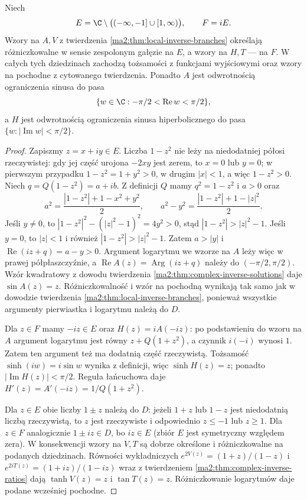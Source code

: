 \begin{twierdzenie}
\label{ma2:thm:standard-inverse-branches}
Niech
\[
 E=\C\setminus\big((-\infty,-1]\cup[1,\infty)\big),
 \qquad F=iE.
\]
Wzory na $A,V$ z twierdzenia \ref{ma2:thm:local-inverse-branches}
określają różniczkowalne w sensie zespolonym gałęzie
na $E$, a wzory na $H,T$ --- na $F$. W całych tych
dziedzinach zachodzą tożsamości z funkcjami wyjściowymi
oraz wzory na pochodne z cytowanego twierdzenia.
Ponadto $A$ jest odwrotnością ograniczenia sinusa do pasa
\[
 \{w\in\C:-\pi/2<\operatorname{Re}w<\pi/2\},
\]
a $H$ jest odwrotnością ograniczenia sinusa hiperbolicznego
do pasa $\{w:|\operatorname{Im}w|<\pi/2\}$.
\end{twierdzenie}
\begin{proof}
Zapiszmy $z=x+iy\in E$. Liczba $1-z^2$ nie leży na
niedodatniej półosi rzeczywistej: gdy jej część urojona
$-2xy$ jest zerem, to $x=0$ lub $y=0$; w pierwszym
przypadku $1-z^2=1+y^2>0$, w drugim $|x|<1$, a więc
$1-z^2>0$. Niech $q=Q(1-z^2)=a+ib$. Z definicji
$Q$ mamy $q^2=1-z^2$ i $a>0$ oraz
\[
 a^2=\frac{|1-z^2|+1-x^2+y^2}{2},
 \qquad
 a^2-y^2=\frac{|1-z^2|+1-|z|^2}{2}.
\]
Jeśli $y\ne0$, to
$|1-z^2|^2-(|z|^2-1)^2=4y^2>0$,
stąd $|1-z^2|>|z|^2-1$. Jeśli $y=0$,
to $|z|<1$ i również $|1-z^2|>|z|^2-1$.
Zatem $a>|y|$ i
$\operatorname{Re}(iz+q)=a-y>0$.
Argument logarytmu we wzorze na $A$ leży więc
w prawej półpłaszczyźnie, a
$\operatorname{Re} A(z)=\operatorname{Arg}(iz+q)$
należy do $(-\pi/2,\pi/2)$.
Wzór kwadratowy z dowodu twierdzenia
\ref{ma2:thm:complex-inverse-solutions} daje
$\sin A(z)=z$. Różniczkowalność i wzór na pochodną
wynikają tak samo jak w dowodzie twierdzenia
\ref{ma2:thm:local-inverse-branches}, ponieważ
wszystkie argumenty pierwiastka i logarytmu należą do $D$.

Dla $z\in F$ mamy $-iz\in E$ oraz
$H(z)=iA(-iz)$: po podstawieniu do wzoru na $A$
argument logarytmu jest równy $z+Q(1+z^2)$,
a czynnik $i(-i)$ wynosi $1$.
Zatem ten argument też ma dodatnią część rzeczywistą.
Tożsamość $\sinh(iw)=i\sin w$ wynika z definicji,
więc $\sinh H(z)=z$; ponadto
$|\operatorname{Im}H(z)|<\pi/2$.
Reguła łańcuchowa daje $H'(z)=A'(-iz)=1/Q(1+z^2)$.

Dla $z\in E$ obie liczby $1\pm z$ należą do $D$:
jeżeli $1+z$ lub $1-z$ jest niedodatnią liczbą
rzeczywistą, to $z$ jest rzeczywiste i odpowiednio
$z\le-1$ lub $z\ge1$. Dla $z\in F$ analogicznie
$1\pm iz\in D$, bo $iz\in E$ (zbiór $E$ jest symetryczny
względem zera).
W konsekwencji wzory na $V,T$ są dobrze określone
i różniczkowalne na podanych dziedzinach.
Równości wykładniczych
$e^{2V(z)}=(1+z)/(1-z)$ i
$e^{2iT(z)}=(1+iz)/(1-iz)$ wraz z twierdzeniem
\ref{ma2:thm:complex-inverse-ratios} dają
$\tanh V(z)=z$ i $\tan T(z)=z$.
Różniczkowanie logarytmów daje podane wcześniej pochodne.


\end{proof}
